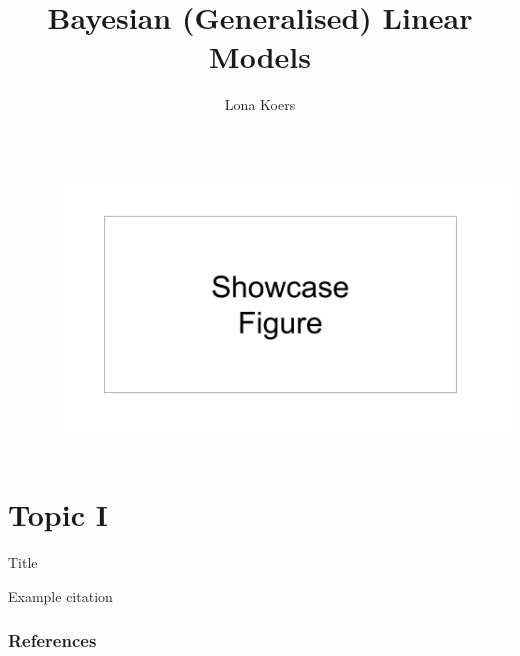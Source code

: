 \documentclass[aspectratio=169]{beamer}
\title{Bayesian (Generalised) Linear Models}
\author{Lona Koers}
\institute[LMU]{LMU} %
{

}
\begin{document}
{
\begin{frame}
\begin{columns}
	\begin{column}{0.4\textwidth}
		\vspace{3cm}
		
		\textbf{\textcolor{white}{\Large Your Title}}
		\vspace{1cm}
		
		\textcolor{white}{\footnotesize Your Name \\
			\today}
	\end{column}
	\begin{column}{0.49\textwidth}
		\vspace{2cm}
		\begin{center}
			\includegraphics[width=1\textwidth]{showcase_figure.png}
		\end{center}
	\end{column}
\end{columns}
\end{frame}
}


\section{Topic I}

\begin{frame}{Title}

Example citation \cite{bischl2015}

\end{frame}


\begin{frame}[allowframebreaks]
        \frametitle{References}
        
        
\end{frame}
\end{document}
